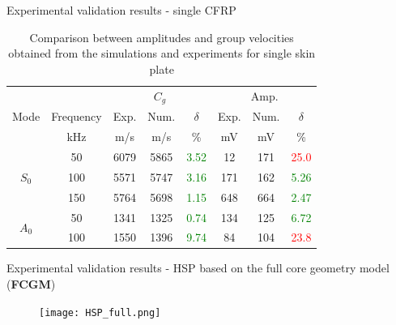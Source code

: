 \documentclass[10pt,aspectratio=169]{beamer} %
\begin{document}
\begin{frame}[label=frame15]{Experimental validation results - single CFRP}
	\begin{table}
		\centering
		\caption{\label{tab:group_velocity_cfrp} Comparison between amplitudes and group velocities obtained from the simulations and experiments for single skin plate}
		\begin{tabular}{cccccccc}
			\toprule
			& & \multicolumn{3}{c}{\(C_g\)} & \multicolumn{3}{c}{Amp.}\\
			Mode & Frequency & Exp. & Num. & \(\delta\)& Exp. & Num. & \(\delta\)\\
			& kHz & m/s & m/s & \% & mV & mV & \% \\
			\midrule
			\multirow{3}{*}{$S_0$} & 50 & 6079 & 5865 & \textcolor{green}{3.52}& 12 & 171 & \textcolor{red}{25.0} \\
			&100& 5571 & 5747 & \textcolor{green}{3.16} & 171 & 162 & \textcolor{green}{5.26}\\
			&150& 5764 & 5698 & \textcolor{green}{1.15} & 648 & 664 & \textcolor{green}{2.47}\\
			\midrule
			\multirow{3}{*}{$A_0$} &50& 1341 & 1325 & \textcolor{green}{0.74} & 134 & 125 & \textcolor{green}{6.72}\\
			&100& 1550 & 1396 & \textcolor{green}{9.74} & 84 & 104 & \textcolor{red}{23.8}\\
			\bottomrule
		\end{tabular}
	\end{table}
\end{frame}
\begin{frame}[label=frame15]{Experimental validation results - HSP based on the full core geometry model (\textbf{FCGM}) }
	\begin{figure}
			\texttt{[image: HSP\_full.png]}
			\label{fig:HSP_full}
		\end{figure}
\end{frame}
\end{document}
